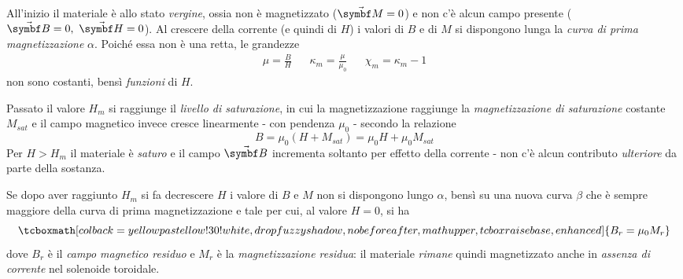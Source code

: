 All'inizio il materiale è allo stato \textit{vergine}, ossia non è magnetizzato ($\vba{M}=0$) e non c'è alcun campo presente ($\vba{B}=0,\ \vba{H}=0$). Al crescere della corrente (e quindi di $H$) i valori di $B$ e di $M$ si dispongono lunga la \textit{curva di prima magnetizzazione} $\alpha$. Poiché essa non è una retta, le grandezze
\begin{align*}
	\mu=\frac{B}{H}&&\kappa_m=\frac{\mu}{\mu_0}&&\chi_m=\kappa_m-1
\end{align*}
non sono costanti, bensì \textit{funzioni} di $H$. 

Passato il valore $H_m$ si raggiunge il \textit{livello di saturazione}, in cui la magnetizzazione raggiunge la \textit{magnetizzazione di saturazione} costante $M_{sat}$ e il campo magnetico invece cresce linearmente - con pendenza $\mu_0$ - secondo la relazione
\begin{equation*}
	B=\mu_0\left(H+M_{sat}\right)=\mu_0 H+\mu_0M_{sat}
\end{equation*}
Per $H>H_m$ il materiale è \textit{saturo} e il campo $\vba{B}$ incrementa soltanto per effetto della corrente - non c'è alcun contributo \textit{ulteriore} da parte della sostanza.

Se dopo aver raggiunto $H_m$ si fa decrescere $H$ i valore di $B$ e $M$ non si dispongono lungo $\alpha$, bensì su una nuova curva $\beta$ che è sempre maggiore della curva di prima magnetizzazione e tale per cui, al valore $H=0$, si ha
\begin{equation}
		\tcboxmath[colback=yellowpastellow!30!white,drop fuzzy shadow, nobeforeafter, math upper, tcbox raise base, enhanced]{B_r=\mu_0M_r}
\end{equation}
dove $B_r$ è il \textit{campo magnetico residuo} e $M_r$ è la \textit{magnetizzazione residua}: il materiale \textit{rimane} quindi magnetizzato anche in \textit{assenza di corrente} nel solenoide toroidale.


